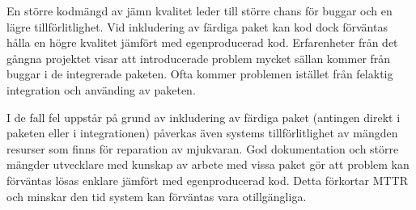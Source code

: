 En större kodmängd av jämn kvalitet leder till större chans för buggar och en lägre tillförlitlighet. Vid inkludering av färdiga paket kan kod dock förväntas hålla en högre kvalitet jämfört med egenproducerad kod. Erfarenheter från det gångna projektet visar att introducerade problem mycket sällan kommer från buggar i de integrerade paketen. Ofta kommer problemen istället från felaktig integration och använding av paketen.

I de fall fel uppstår på grund av inkludering av färdiga paket (antingen direkt i paketen eller i integrationen) påverkas även systems tillförlitlighet av mängden resurser som finns för reparation av mjukvaran. God dokumentation och större mängder utvecklare med kunskap av arbete med vissa paket gör att problem kan förväntas lösas enklare jämfört med egenproducerad kod. Detta förkortar MTTR och minskar den tid system kan förväntas vara otillgängliga.
